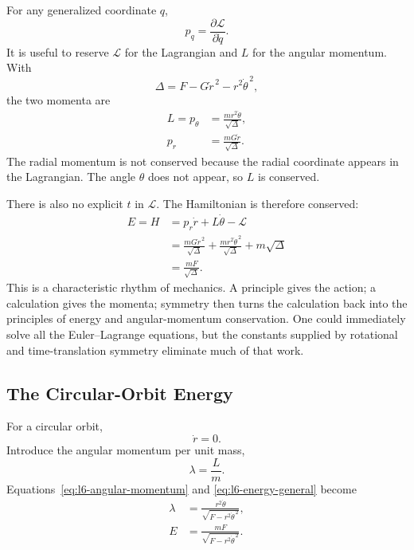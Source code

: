 For any generalized coordinate \(q\),
\begin{equation}
p_q=\frac{\partial\mathcal L}{\partial\dot q}.
\end{equation}
It is useful to reserve \(\mathcal L\) for the Lagrangian and \(L\) for the
angular momentum.  With
\begin{equation}
\Delta=F-G\dot r^{\,2}-r^{2}\dot\theta^{\,2},
\end{equation}
the two momenta are
\begin{align}
L=p_\theta
&=\frac{mr^{2}\dot\theta}{\sqrt{\Delta}},
\label{eq:l6-angular-momentum}\\
p_r
&=\frac{mG\dot r}{\sqrt{\Delta}}.
\label{eq:l6-radial-momentum}
\end{align}
The radial momentum is not conserved because the radial coordinate appears in
the Lagrangian.  The angle \(\theta\) does not appear, so \(L\) is conserved.

There is also no explicit \(t\) in \(\mathcal L\).  The Hamiltonian is
therefore conserved:
\begin{align}
E=H
&=p_r\dot r+L\dot\theta-\mathcal L \\
&=\frac{mG\dot r^{\,2}}{\sqrt{\Delta}}
  +\frac{mr^{2}\dot\theta^{\,2}}{\sqrt{\Delta}}
  +m\sqrt{\Delta} \\
&=\frac{mF}{\sqrt{\Delta}}.
\label{eq:l6-energy-general}
\end{align}
This is a characteristic rhythm of mechanics.  A principle gives the action;
a calculation gives the momenta; symmetry then turns the calculation back
into the principles of energy and angular-momentum conservation.  One could
immediately solve all the Euler--Lagrange equations, but the constants supplied
by rotational and time-translation symmetry eliminate much of that work.

\subsection{The Circular-Orbit Energy}

For a circular orbit,
\begin{equation}
\dot r=0.
\end{equation}
Introduce the angular momentum per unit mass,
\begin{equation}
\lambda=\frac{L}{m}.
\end{equation}
Equations~\eqref{eq:l6-angular-momentum} and
\eqref{eq:l6-energy-general} become
\begin{align}
\lambda
&=\frac{r^{2}\dot\theta}
{\sqrt{F-r^{2}\dot\theta^{\,2}}},
\label{eq:l6-lambda-circular}\\
E
&=\frac{mF}{\sqrt{F-r^{2}\dot\theta^{\,2}}}.
\label{eq:l6-energy-circular-first}
\end{align}

